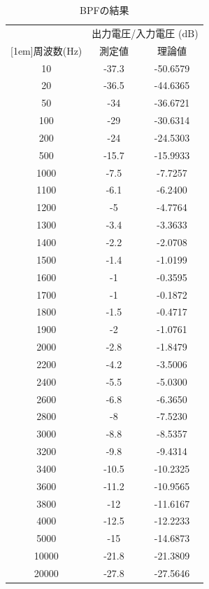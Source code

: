 \documentclass[11pt,a4j]{jsarticle}
\begin{document}
\begin{table}[H]
  \caption{BPFの結果}
  \label{tab:bpf}
  \begin{center}
      \begin{tabular}{|c|c|c|}
        \hline
        & \multicolumn{2}{c|}{出力電圧/入力電圧 ($\mathrm{dB}$)} \\ \cline{2-3}
        \raisebox{0.8em}[1em]{周波数($\mathrm{Hz}$)} & 測定値 & 理論値 \\ \hline
        10	&	-37.3	&	-50.6579	\\
        20	&	-36.5	&	-44.6365	\\
        50	&	-34	&	-36.6721	\\
        100	&	-29	&	-30.6314	\\
        200	&	-24	&	-24.5303	\\
        500	&	-15.7	&	-15.9933	\\
        1000	&	-7.5	&	-7.7257	\\
        1100	&	-6.1	&	-6.2400	\\
        1200	&	-5	&	-4.7764	\\
        1300	&	-3.4	&	-3.3633	\\
        1400	&	-2.2	&	-2.0708	\\
        1500	&	-1.4	&	-1.0199	\\
        1600	&	-1	&	-0.3595	\\
        1700	&	-1	&	-0.1872	\\
        1800	&	-1.5	&	-0.4717	\\
        1900	&	-2	&	-1.0761	\\
        2000	&	-2.8	&	-1.8479	\\
        2200	&	-4.2	&	-3.5006	\\
        2400	&	-5.5	&	-5.0300	\\
        2600	&	-6.8	&	-6.3650	\\
        2800	&	-8	&	-7.5230	\\
        3000	&	-8.8	&	-8.5357	\\
        3200	&	-9.8	&	-9.4314	\\
        3400	&	-10.5	&	-10.2325	\\
        3600	&	-11.2	&	-10.9565	\\
        3800	&	-12	&	-11.6167	\\
        4000	&	-12.5	&	-12.2233	\\
        5000	&	-15	&	-14.6873	\\
        10000	&	-21.8	&	-21.3809	\\
        20000	&	-27.8	&	-27.5646	\\

\end{tabular}
\end{center}
\end{table}
\end{document}
